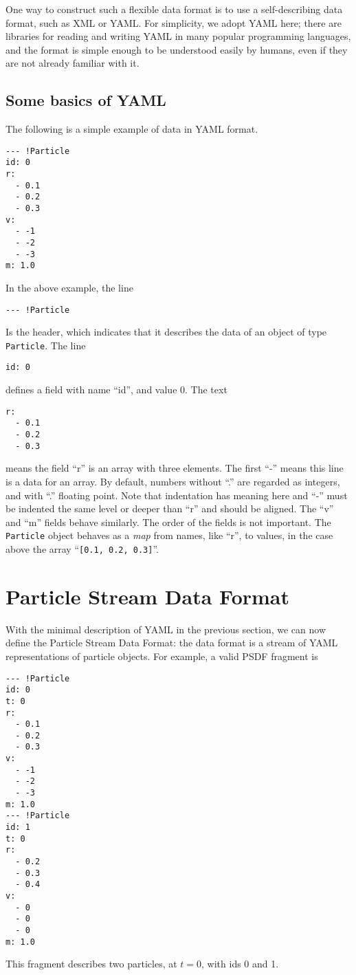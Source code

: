 \documentclass[5p,authoryear]{elsarticle}
\begin{document}
One way to construct such a flexible data format is to use a 
self-describing data format, such as XML or YAML. For simplicity, we
adopt YAML \citep{YAML2011} here; there are libraries for reading and
writing YAML in many popular programming languages, and the format is
simple enough to be understood easily by humans, even if they are not
already familiar with it.

\subsection{Some basics of YAML}

The following is a simple example of data in YAML format.
\begin{verbatim}
--- !Particle
id: 0
r:
  - 0.1
  - 0.2
  - 0.3
v:
  - -1
  - -2
  - -3
m: 1.0
\end{verbatim}
In the above example, the line
\begin{verbatim}
--- !Particle
\end{verbatim}
Is the header, which indicates that it describes the data of an object
of type {\tt Particle}.  The line
\begin{verbatim}
id: 0
\end{verbatim}
defines a field with name ``id'', and value 0.  The text
\begin{verbatim}
r:
  - 0.1
  - 0.2
  - 0.3
\end{verbatim}
means the field ``r'' is an array with three elements. The first ``-''
means this line is a data for an array.  By default, numbers without
``.'' are regarded as integers, and with ``.'' floating point. Note
that indentation has meaning here and ``-'' must be indented the same
level or deeper than ``r'' and should be aligned.  The ``v'' and ``m''
fields behave similarly.  The order of the fields is not important.
The {\tt Particle} object behaves as a \emph{map} from names, like
``r'', to values, in the case above the array ``\verb|[0.1, 0.2, 0.3]|''.

\section{Particle Stream Data Format}

With the minimal description of YAML in the previous section, we can
now define the Particle Stream Data Format: the data format is a
stream of YAML representations of particle objects.  For example, a
valid PSDF fragment is
\begin{verbatim}
--- !Particle
id: 0
t: 0
r:
  - 0.1
  - 0.2
  - 0.3
v:
  - -1
  - -2
  - -3
m: 1.0
--- !Particle
id: 1
t: 0
r:
  - 0.2
  - 0.3
  - 0.4
v:
  - 0
  - 0
  - 0
m: 1.0
\end{verbatim}
This fragment describes two particles, at $t = 0$, with ids 0 and 1.
\end{document}
